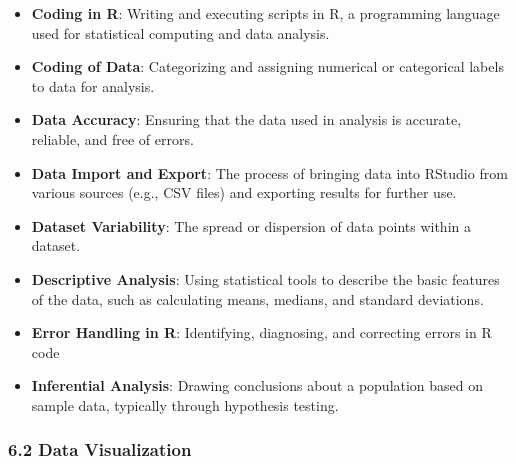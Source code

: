 \documentclass[
]{book}
\providecommand{\tightlist}{%
  \setlength{\itemsep}{0pt}\setlength{\parskip}{0pt}}
\begin{document}
\begin{itemize}
\tightlist
\item
  \textbf{Coding in R}: Writing and executing scripts in R, a programming language used for statistical computing and data analysis.
\item
  \textbf{Coding of Data}: Categorizing and assigning numerical or categorical labels to data for analysis.
\item
  \textbf{Data Accuracy}: Ensuring that the data used in analysis is accurate, reliable, and free of errors.
\item
  \textbf{Data Import and Export}: The process of bringing data into RStudio from various sources (e.g., CSV files) and exporting results for further use.
\item
  \textbf{Dataset Variability}: The spread or dispersion of data points within a dataset.
\item
  \textbf{Descriptive Analysis}: Using statistical tools to describe the basic features of the data, such as calculating means, medians, and standard deviations.
\item
  \textbf{Error Handling in R}: Identifying, diagnosing, and correcting errors in R code
\item
  \textbf{Inferential Analysis}: Drawing conclusions about a population based on sample data, typically through hypothesis testing.
\end{itemize}

\subsubsection*{\texorpdfstring{\textbf{6.2 Data Visualization}}{6.2 Data Visualization}}\label{data-visualization-2}
\end{document}
